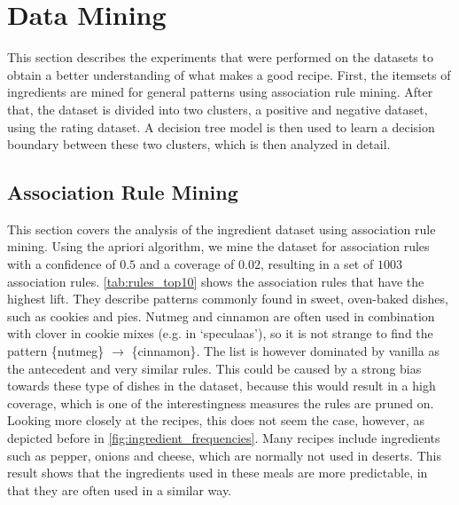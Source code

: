 \section{Data Mining}
\label{sec:data_mining}

This section describes the experiments that were performed on the datasets to obtain a better understanding of what makes a good recipe.
First, the itemsets of ingredients are mined for general patterns using association rule mining.
After that, the dataset is divided into two clusters, a positive and negative dataset, using the rating dataset.
A decision tree model is then used to learn a decision boundary between these two clusters, which is then analyzed in detail.




\subsection{Association Rule Mining}
\label{subsec:association_rule_mining}

This section covers the analysis of the ingredient dataset using association rule mining.
Using the apriori algorithm, we mine the dataset for association rules with a confidence of $0.5$ and a coverage of $0.02$, resulting in a set of $1003$ association rules.
\cref{tab:rules_top10} shows the association rules that have the highest lift.
They describe patterns commonly found in sweet, oven-baked dishes, such as cookies and pies.
Nutmeg and cinnamon are often used in combination with clover in cookie mixes (e.g. in `speculaas'), so it is not strange to find the pattern \{nutmeg\} $\rightarrow$ \{cinnamon\}.
The list is however dominated by vanilla as the antecedent and very similar rules.
This could be caused by a strong bias towards these type of dishes in the dataset, because this would result in a high coverage, which is one of the interestingness measures the rules are pruned on.
Looking more closely at the recipes, this does not seem the case, however, as depicted before in \cref{fig:ingredient_frequencies}.
Many recipes include ingredients such as pepper, onions and cheese, which are normally not used in deserts.
This result shows that the ingredients used in these meals are more predictable, in that they are often used in a similar way.



